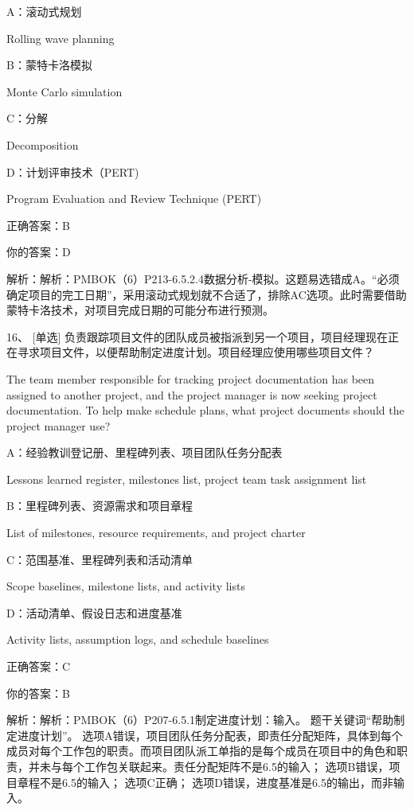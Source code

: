 A：滚动式规划

Rolling wave planning

B：蒙特卡洛模拟

Monte Carlo simulation

C：分解

Decomposition

D：计划评审技术（PERT)

Program Evaluation and Review Technique (PERT)

正确答案：B

你的答案：D

解析：解析：PMBOK（6）P213-6.5.2.4数据分析-模拟。这题易选错成A。“必须确定项目的完工日期”，采用滚动式规划就不合适了，排除AC选项。此时需要借助蒙特卡洛技术，对项目完成日期的可能分布进行预测。



16、 [单选] 负责跟踪项目文件的团队成员被指派到另一个项目，项目经理现在正在寻求项目文件，以便帮助制定进度计划。项目经理应使用哪些项目文件？

The team member responsible for tracking project documentation has been assigned to another project, and the project manager is now seeking project documentation. To help make schedule plans, what project documents should the project manager use?

A：经验教训登记册、里程碑列表、项目团队任务分配表

Lessons learned register, milestones list, project team task assignment list

B：里程碑列表、资源需求和项目章程

List of milestones, resource requirements, and project charter

C：范围基准、里程碑列表和活动清单

Scope baselines, milestone lists, and activity lists

D：活动清单、假设日志和进度基准

Activity lists, assumption logs, and schedule baselines

正确答案：C

你的答案：B

解析：解析：PMBOK（6）P207-6.5.1制定进度计划：输入。 题干关键词“帮助制定进度计划”。 选项A错误，项目团队任务分配表，即责任分配矩阵，具体到每个成员对每个工作包的职责。而项目团队派工单指的是每个成员在项目中的角色和职责，并未与每个工作包关联起来。责任分配矩阵不是6.5的输入； 选项B错误，项目章程不是6.5的输入； 选项C正确； 选项D错误，进度基准是6.5的输出，而非输入。



